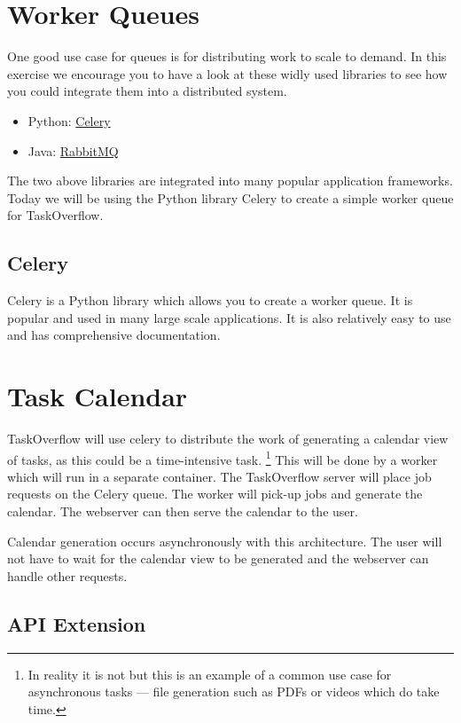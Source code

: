 \documentclass{csse4400}
\begin{document}
\section{Worker Queues}

One good use case for queues is for distributing work to scale to demand.
In this exercise we encourage you to have a look at these widly used libraries to see how you could integrate them into a distributed system.

\begin{itemize}
  \item Python: \href{https://docs.celeryq.dev/en/stable/}{Celery}
  \item Java: \href{https://www.rabbitmq.com/tutorials/tutorial-one-java.html}{RabbitMQ}
\end{itemize}

The two above libraries are integrated into many popular application frameworks.
Today we will be using the Python library Celery to create a simple worker queue for TaskOverflow.

\subsection{Celery}

Celery is a Python library which allows you to create a worker queue.
It is popular and used in many large scale applications.
It is also relatively easy to use and has comprehensive documentation.


\section{Task Calendar}

TaskOverflow will use celery to distribute the work of generating a calendar view of tasks,
as this could be a time-intensive task.%
\footnote{In reality it is not but this is an example of a common use case for asynchronous tasks --- file generation such as PDFs or videos which do take time.}
This will be done by a worker which will run in a separate container.
The TaskOverflow server will place job requests on the Celery queue.
The worker will pick-up jobs and generate the calendar.
The webserver can then serve the calendar to the user.

Calendar generation occurs asynchronously with this architecture.
The user will not have to wait for the calendar view to be generated and the webserver can handle other requests.

\subsection{API Extension}
\label{sect:apiext}
\end{document}

